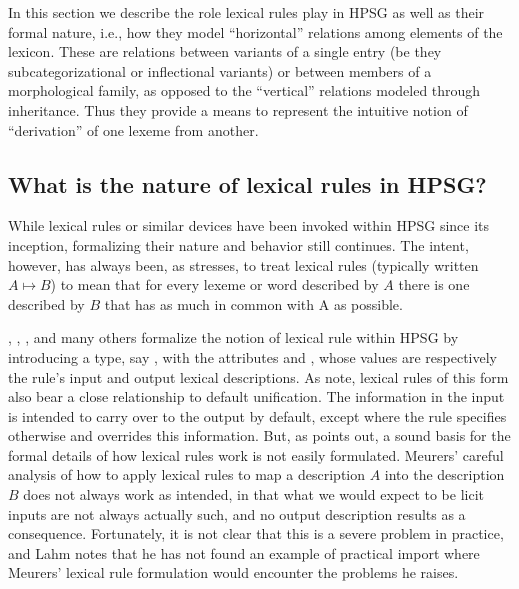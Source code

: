 \documentclass[output=paper,biblatex,babelshorthands,newtxmath,draftmode,colorlinks,citecolor=brown]{langscibook}
\begin{document}
In this section we describe the role lexical rules play in HPSG as well as their formal nature, i.e., how they model ``horizontal'' relations among elements of the lexicon. These are relations between variants of a single entry (be they subcategorizational or inflectional variants) or between members of a morphological family, as opposed to the ``vertical'' relations modeled through inheritance. Thus they provide a means to represent the intuitive notion of ``derivation'' of one lexeme from another. 

\subsection{What is the nature of lexical rules in HPSG?}
\label{lexicon-sec-nature-of-lexical-rules}

\largerpage
While lexical rules or similar devices have been invoked within HPSG since its inception,
formalizing their nature and behavior still continues.  The intent, however, has always been, as
\citet{Lahm2016} stresses, to treat lexical rules (typically written $A \mapsto B$\is{$\mapsto$}) to
mean that for every lexeme or word described by $A$ there is one described by $B$ that has as much
in common with A as possible.

\citet{CopestakeandBriscoe1991}, \citet{BriscoeandCopestake1999}, \citet{Meurers2001}, and many
others formalize the notion of lexical rule within HPSG by introducing a type, say ,
with the attributes  and , whose values are respectively the rule's input and
output lexical descriptions. As \citet{BriscoeandCopestake1999} note, lexical rules of this form
also bear a close relationship to default unification.  The information in the input is intended to
carry over to the output by default, except where the rule specifies otherwise and overrides this
information. But, as \citet{Lahm2016} points out, a sound basis for the formal details of how
lexical rules work is not easily formulated. Meurers' careful analysis of how to apply lexical rules
to map a description $A$ into the description $B$ does not always work as intended, in that what we
would expect to be licit inputs are not always actually such, and no output description results as a
consequence. Fortunately, it is not clear that this is a severe problem in practice, and Lahm notes
that he has not found an example of practical import where Meurers' lexical rule formulation would
encounter the problems he raises.
\end{document}
